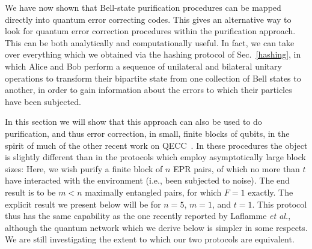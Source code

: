 We have now shown that Bell-state purification procedures can be
mapped directly into quantum error correcting codes.  This gives an
alternative way to look for quantum error correction procedures within
the purification approach.  This can be both analytically and
computationally useful.  In fact, we can take over everything which we
obtained via the hashing protocol of Sec.~\ref{hashing}, in which Alice
and Bob perform a sequence of unilateral and bilateral unitary
operations to transform their bipartite state from one collection of
Bell states to another, in order to gain information about the errors
to which their particles have been subjected.
 
In this section we will show that this approach can also be used to do
purification, and thus error correction, in small, finite blocks of
qubits, in the spirit of much of the other recent work on
QECC~\cite{ChuangLaf,shellgame,Steane,Laflamme,EM,Sam, balance,newest}.  In these
procedures the object is slightly different than in the protocols
which employ asymptotically large block sizes: Here, we wish purify a
finite block of $n$ EPR pairs, of which no more than $t$ have
interacted with the environment (i.e., been subjected to noise).  The
end result is to be $m<n$ maximally entangled pairs, for which $F=1$
exactly.  The explicit result we present below will be for $n=5$,
$m=1$, and $t=1$.  This protocol thus has the same capability as the
one recently reported by Laflamme {\it et al.}\cite{Laflamme},
although the quantum network which we derive below is simpler in some
respects.  We are still investigating the extent to which our two
protocols are equivalent.
 
